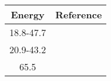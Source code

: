 \centering
\begin{tabular}{c c}
    \toprule
    \bf{Energy} & \bf{Reference} \\
    \midrule
    18.8-47.7 & \cite{Carlson1975}\\
    20.9-43.2 & \cite{Slaus1975}\\
    65.5 & \cite{Ingemarsson1999}\\
    \bottomrule
\end{tabular}
